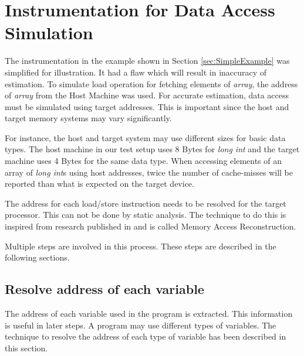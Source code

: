\section{Instrumentation for Data Access Simulation}
The instrumentation in the example shown in Section \ref{sec:SimpleExample} was simplified for illustration. It had a flaw which will result in inaccuracy of estimation. To simulate load operation for fetching elements of \emph{array}, the address of \emph{array} from the Host Machine was used. For accurate estimation, data access must be simulated using target addresses. This is important since the host and target memory systems may vary significantly. 

For instance, the host and target system may use different sizes for basic data types. The host machine in our test setup uses 8 Bytes for \emph{long int} and the target machine uses 4 Bytes for the same data type. When accessing elements of an array of \emph{long int}s using host addresses, twice the number of cache-misses will be reported than what is expected on the target device.

The address for each load/store instruction needs to be resolved for the target processor. This can not be done by static analysis. The technique to do this is inspired from research published in \cite{Lu2013} and is called Memory Access Reconstruction. 

Multiple steps are involved in this process. These steps are described in the following sections.

%

\subsection{Resolve address of each variable}
The address of each variable used in the program is extracted. This information is useful in later steps. A program may use different types of variables. The technique to resolve the address of each type of variable has been described in this section.

